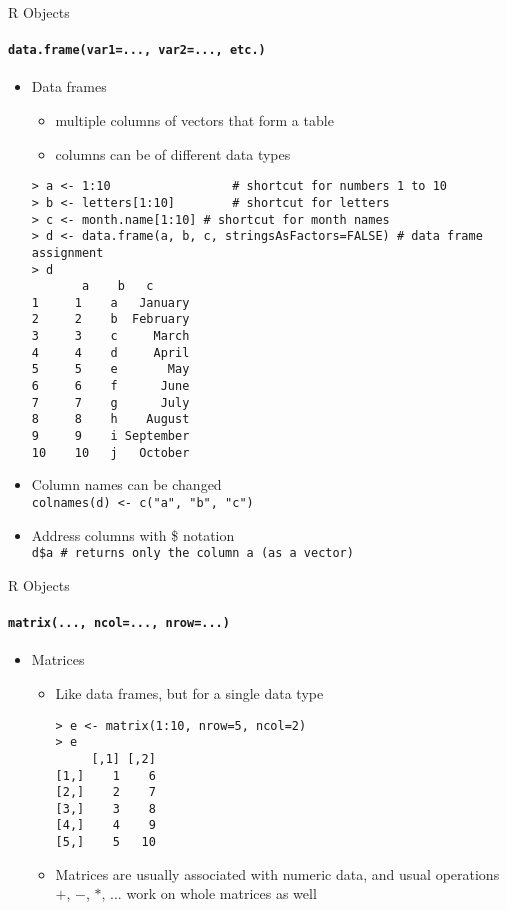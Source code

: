 \documentclass{beamer}
\begin{document}
\begin{frame}{R Objects}
    \framesubtitle{{\tt data.frame(var1=..., var2=..., etc.)}}
    \begin{itemize}
        \item Data frames
        \begin{itemize}
            \item multiple columns of vectors that form a table
            \item columns can be of different data types
        \end{itemize}
        \begin{verbatim}
> a <- 1:10 				# shortcut for numbers 1 to 10
> b <- letters[1:10] 		# shortcut for letters
> c <- month.name[1:10]	# shortcut for month names
> d <- data.frame(a, b, c, stringsAsFactors=FALSE)‏	# data frame assignment
> d
	   a    b   c		
1     1    a   January
2     2    b  February
3     3    c     March
4     4    d     April
5     5    e       May
6     6    f      June
7     7    g      July
8     8    h    August
9     9    i September
10    10   j   October\end{verbatim}
        \item Column names can be changed\\
        {\tt colnames(d) <- c("a", "b", "c")}
        \item Address columns with \$ notation \\
        {\tt d\$a \# returns only the column a (as a vector)}
    \end{itemize}
\end{frame}

\begin{frame}{R Objects}
    \framesubtitle{{\tt matrix(..., ncol=..., nrow=...)}}
    \begin{itemize}
        \item Matrices
        \begin{itemize}
            \item Like data frames, but for a single data type
        \begin{verbatim}
> e <- matrix(1:10, nrow=5, ncol=2)
> e
     [,1] [,2]
[1,]    1    6
[2,]    2    7
[3,]    3    8
[4,]    4    9
[5,]    5   10\end{verbatim}
        \item Matrices are usually associated with numeric data, and usual operations $+$, $-$, $*$, ... work on whole matrices as well
        \end{itemize}
    \end{itemize}
\end{frame}
\end{document}
